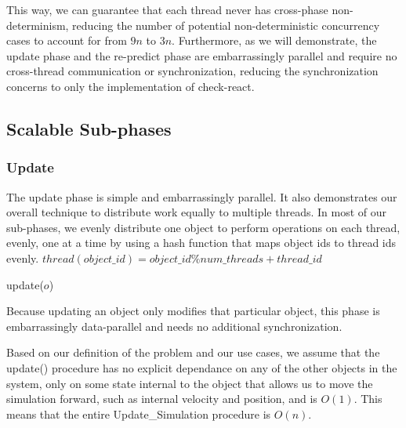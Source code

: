 \documentclass[CEJCS,PDF]{cej} %
\begin{document}
This way, we can guarantee that each thread never has cross-phase non-determinism, reducing the number of potential non-deterministic concurrency cases to account for from $9n$ to $3n$.
Furthermore, as we will demonstrate, the update phase and the re-predict phase are embarrassingly parallel and require no cross-thread communication or synchronization,
reducing the synchronization concerns to only the implementation of check-react.

\subsection{Scalable Sub-phases}
\label{sec:subphase}

\subsubsection{Update}
\label{sub:update}
The update phase is simple and embarrassingly parallel.  It also demonstrates our overall technique to distribute work equally to multiple threads.  In most of our sub-phases,
we evenly distribute one object to perform operations on each thread, evenly, one at a time by using a hash function that maps object ids to thread ids evenly. $thread(object\_id) = object\_id \% num\_threads + thread\_id$
\begin{algorithmic}
	\STATE update($o$)
\ENDFOR
\end{algorithmic}

Because updating an object only modifies that particular object, this phase is embarrassingly data-parallel and needs no additional synchronization.

Based on our definition of the problem and our use cases, we assume that the update() procedure has no explicit dependance on any of the other objects
in the system, only on some state internal to the object that allows us to move the simulation forward, such as internal velocity and position, and is $O(1)$.  This means
that the entire Update\_Simulation procedure is $O(n)$.
\end{document}

